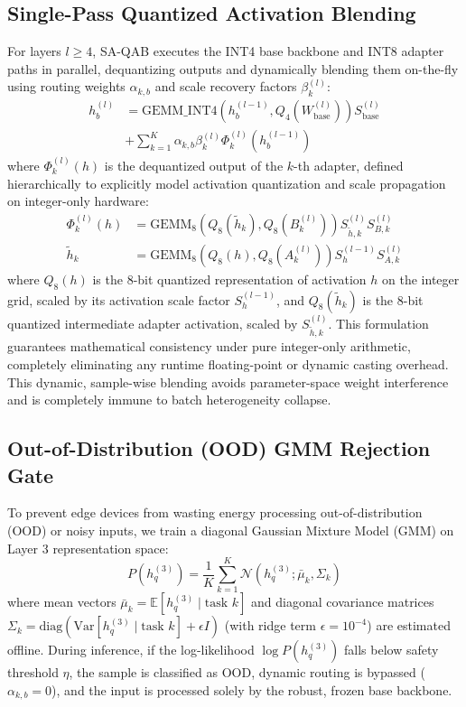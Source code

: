 \subsection{Single-Pass Quantized Activation Blending}
For layers $l \ge 4$, SA-QAB executes the INT4 base backbone and INT8 adapter paths in parallel, dequantizing outputs and dynamically blending them on-the-fly using routing weights $\alpha_{k, b}$ and scale recovery factors $\beta_k^{(l)}$:
\begin{equation}
\begin{split}
    h_b^{(l)} &= \text{GEMM\_INT4}\left(h_b^{(l-1)}, Q_4(W_{\text{base}}^{(l)})\right) S_{\text{base}}^{(l)} \\
    &+ \sum_{k=1}^K \alpha_{k, b} \beta_k^{(l)} \Phi_k^{(l)}\left(h_b^{(l-1)}\right)
\end{split}
\end{equation}
where $\Phi_k^{(l)}(h)$ is the dequantized output of the $k$-th adapter, defined hierarchically to explicitly model activation quantization and scale propagation on integer-only hardware:
\begin{equation}
\begin{split}
    \Phi_k^{(l)}(h) &= \text{GEMM}_8\left(Q_8(\tilde{h}_k), Q_8(B_k^{(l)})\right) S_{\tilde{h}, k}^{(l)} S_{B, k}^{(l)} \\
    \tilde{h}_k &= \text{GEMM}_8\left(Q_8(h), Q_8(A_k^{(l)})\right) S_h^{(l-1)} S_{A, k}^{(l)}
\end{split}
\end{equation}
where $Q_8(h)$ is the 8-bit quantized representation of activation $h$ on the integer grid, scaled by its activation scale factor $S_h^{(l-1)}$, and $Q_8(\tilde{h}_k)$ is the 8-bit quantized intermediate adapter activation, scaled by $S_{\tilde{h}, k}^{(l)}$. This formulation guarantees mathematical consistency under pure integer-only arithmetic, completely eliminating any runtime floating-point or dynamic casting overhead. This dynamic, sample-wise blending avoids parameter-space weight interference and is completely immune to batch heterogeneity collapse.

\subsection{Out-of-Distribution (OOD) GMM Rejection Gate}
To prevent edge devices from wasting energy processing out-of-distribution (OOD) or noisy inputs, we train a diagonal Gaussian Mixture Model (GMM) on Layer 3 representation space:
\begin{equation}
    P\left(h_q^{(3)}\right) = \frac{1}{K} \sum_{k=1}^K \mathcal{N}\left(h_q^{(3)}; \bar{\mu}_k, \Sigma_k\right)
\end{equation}
where mean vectors $\bar{\mu}_k = \mathbb{E}[h_q^{(3)} \mid \text{task } k]$ and diagonal covariance matrices $\Sigma_k = \text{diag}(\text{Var}[h_q^{(3)} \mid \text{task } k] + \epsilon I)$ (with ridge term $\epsilon = 10^{-4}$) are estimated offline. During inference, if the log-likelihood $\log P(h_q^{(3)})$ falls below safety threshold $\eta$, the sample is classified as OOD, dynamic routing is bypassed ($\alpha_{k, b}=0$), and the input is processed solely by the robust, frozen base backbone.

